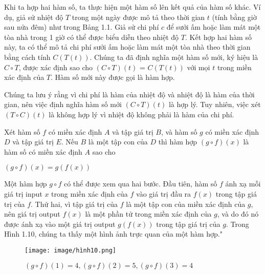 \documentclass[a4paper,12pt,openany]{book}
\begin{document}
Khi ta hợp hai hàm số, ta thực hiện một hàm số lên kết quả của hàm số khác. Ví dụ, giả sử nhiệt độ $T$ trong một ngày được mô tả theo thời gian $t$ (tính bằng giờ sau nửa đêm) như trong Bảng 1.1. Giả sử chi phí $c$ để sưởi ấm hoặc làm mát một tòa nhà trong 1 giờ có thể được biểu diễn theo nhiệt độ $T$. Kết hợp hai hàm số này, ta có thể mô tả chi phí sưởi ấm hoặc làm mát một tòa nhà theo thời gian bằng cách tính $C(T(t))$. Chúng ta đã định nghĩa một hàm số mới, ký hiệu là $C \circ T$, được xác định sao cho $(C \circ T)(t)$ = $C(T(t))$ với mọi $t$ trong miền xác định của $T$. Hàm số mới này được gọi là hàm hợp.
\par
\vspace{10pt}
Chúng ta lưu ý rằng vì chi phí là hàm của nhiệt độ và nhiệt độ là hàm của thời gian, nên việc định nghĩa hàm số mới $(C \circ T)(t)$ là hợp lý. Tuy nhiên, việc xét $(T \circ C)(t)$ là không hợp lý vì nhiệt độ không phải là hàm của chi phí.
\vspace{10pt}
\begin{tcolorbox}[
    colframe=blue!10,      %
    colback=blue!5,    %
    coltitle=black,     %
    fonttitle=\bfseries,%
    title=Định nghĩa    %
    ]
Xét hàm số $f$ có miền xác định $A$ và tập giá trị $B$, và hàm số $g$ có miền xác định $D$ và tập giá trị $E$. Nếu $B$ là một tập con của $D$ thì hàm hợp $(g \circ f)(x)$ là hàm số có miền xác định $A$ sao cho

\begin{center}
    $(g \circ f)(x) = g(f(x))$
\end{center}

\end{tcolorbox}
\vspace{10pt}
Một hàm hợp $g \circ f$ có thể được xem qua hai bước. Đầu tiên, hàm số $f$ ánh xạ mỗi giá trị input $x$ trong miền xác định của $f$ vào giá trị đầu ra $f(x)$ trong tập giá trị của $f$. Thứ hai, vì tập giá trị của $f$ là một tập con của miền xác định của $g$, nên giá trị output $f(x)$ là một phần tử trong miền xác định của $g$, và do đó nó được ánh xạ vào một giá trị output $g(f(x))$ trong tập giá trị của $g$. Trong Hình 1.10, chúng ta thấy một hình ảnh trực quan của một hàm hợp."

\begin{figure}[H]
    \centering
    \texttt{[image: image/hình10.png]}
    \caption{ $(g\circ f)(1) = 4, 
 (g\circ f)(2) = 5, (g\circ f)(3) = 4$ }
    \label{fig:enter-label}
\end{figure}
\end{document}
